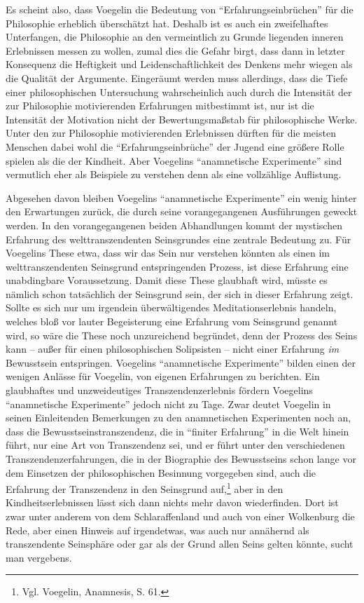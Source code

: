 Es scheint also, dass Voegelin die Bedeutung von "`Erfahrungseinbrüchen"' für
die Philosophie erheblich überschätzt hat. Deshalb ist es auch ein
zweifelhaftes Unterfangen, die Philosophie an den vermeintlich zu Grunde
liegenden inneren Erlebnissen messen zu wollen, zumal dies die Gefahr birgt,
dass dann in letzter Konsequenz die Heftigkeit und Leidenschaftlichkeit
des Denkens mehr wiegen als die Qualität der Argumente. Eingeräumt werden muss
allerdings, dass die Tiefe einer philosophischen Untersuchung wahrscheinlich
auch durch die Intensität der zur Philosophie motivierenden Erfahrungen
mitbestimmt ist, nur ist die Intensität der Motivation nicht der
Bewertungsmaßstab für philosophische Werke. Unter den zur Philosophie
motivierenden Erlebnissen dürften für die meisten Menschen dabei wohl die
"`Erfahrungseinbrüche"' der Jugend eine größere Rolle spielen als die der
Kindheit. Aber Voegelins "`anamnetische Experimente"' sind vermutlich eher als
Beispiele zu verstehen denn als eine vollzählige Auflistung.

Abgesehen davon bleiben Voegelins "`anamnetische Experimente"' ein wenig
hinter den Erwartungen zurück, die durch seine vorangegangenen Ausführungen
geweckt werden. In den vorangegangenen beiden Abhandlungen kommt der
mystischen Erfahrung des welttranszendenten Seinsgrundes eine zentrale
Bedeutung zu. Für Voegelins These etwa, dass wir das Sein nur verstehen
könnten als einen im welttranszendenten Seinsgrund entspringenden Prozess, ist
diese Erfahrung eine unabdingbare Voraussetzung. Damit diese These glaubhaft
wird, müsste es nämlich schon tatsächlich der Seinsgrund sein, der sich in
dieser Erfahrung zeigt. Sollte es sich nur um irgendein überwältigendes
Meditationserlebnis handeln, welches bloß vor lauter Begeisterung eine
Erfahrung vom Seinsgrund genannt wird, so wäre die These noch unzureichend
begründet, denn der Prozess des Seins kann -- außer für einen philosophischen
Solipsisten -- nicht einer Erfahrung {\em im} Bewusstsein entspringen.
Voegelins "`anamnetische Experimente"' bilden einen der wenigen Anlässe für
Voegelin, von eigenen Erfahrungen zu berichten.  Ein glaubhaftes und
unzweideutiges Transzendenzerlebnis fördern Voegelins "`anamnetische
Experimente"' jedoch nicht zu Tage. Zwar deutet Voegelin in seinen
Einleitenden Bemerkungen zu den anamnetischen Experimenten noch an, dass die
Bewusstseinstranszendenz, die in "`finiter Erfahrung"' in die Welt hinein
führt, nur eine Art von Transzendenz sei, und er führt unter den verschiedenen
Transzendenzerfahrungen, die in der Biographie des Bewusstseins schon lange
vor dem Einsetzen der philosophischen Besinnung vorgegeben sind, auch die
Erfahrung der Transzendenz in den Seinsgrund auf,\footnote{Vgl.  Voegelin,
  Anamnesis, S. 61.} aber in den Kindheitserlebnissen lässt sich dann nichts
mehr davon wiederfinden. Dort ist zwar unter anderem von dem Schlaraffenland
und auch von einer Wolkenburg die Rede, aber einen Hinweis auf irgendetwas,
was auch nur annähernd als transzendente Seinsphäre oder gar als der Grund
allen Seins gelten könnte, sucht man vergebens.

